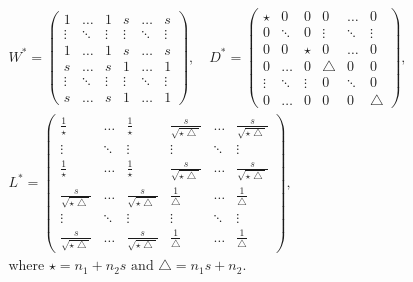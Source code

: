 \begin{equation}
\begin{gathered}
  W^* = \left(
  \begin{array}{cccccc}
    1 & \hdots & 1 & s & \hdots & s \\
    \vdots & \ddots & \vdots & \vdots & \ddots & \vdots \\
    1 & \hdots & 1 & s & \hdots & s \\
   s & \hdots & s & 1 & \hdots & 1 \\
    \vdots & \ddots & \vdots & \vdots & \ddots & \vdots \\
    s & \hdots & s & 1 & \hdots & 1 
  \end{array} \right) , \quad 
%
 D^* = \left(
  \begin{array}{cccccc}
    \star & 0 & 0 & 0 & \hdots & 0 \\
    0 & \ddots & 0 & \vdots & \ddots & \vdots \\
    0 & 0 & \star & 0 & \hdots & 0 \\
   0 & \hdots & 0 & \bigtriangleup & 0 & 0 \\
    \vdots & \ddots & \vdots & 0 & \ddots & 0 \\
    0 & \hdots & 0 & 0 & 0 & \bigtriangleup 
  \end{array} \right), \\
%
 L^* = \left(
  \begin{array}{cccccc}
    \frac{1}{\star} & \hdots & \frac{1}{\star} & \frac{s}{\sqrt{\star \bigtriangleup}} & \hdots & \frac{s}{\sqrt{\star \bigtriangleup}} \\
    \vdots & \ddots & \vdots & \vdots & \ddots & \vdots \\
    \frac{1}{\star} & \hdots & \frac{1}{\star} & \frac{s}{\sqrt{\star \bigtriangleup}} & \hdots & \frac{s}{\sqrt{\star \bigtriangleup}} \\
   \frac{s}{\sqrt{\star \bigtriangleup}} & \hdots & \frac{s}{\sqrt{\star \bigtriangleup}} & \frac{1}{\bigtriangleup}  & \hdots &  \frac{1}{\bigtriangleup} \\
    \vdots & \ddots & \vdots & \vdots & \ddots & \vdots \\
    \frac{s}{\sqrt{\star \bigtriangleup}} & \hdots & \frac{s}{\sqrt{\star \bigtriangleup}} & \frac{1}{\bigtriangleup}  & \hdots &  \frac{1}{\bigtriangleup} 
  \end{array} \right), 
\\
\text{where } \star = n_1 + n_2s \text{ and } \bigtriangleup = n_1s + n_2. 
\end{gathered} \label{eq:example_repeated}
\end{equation}

